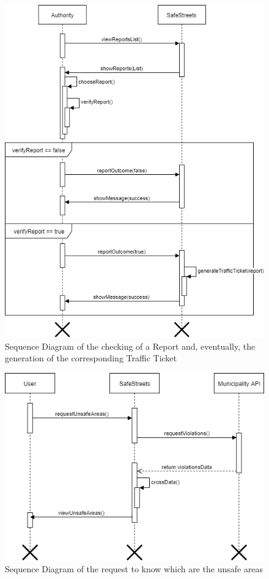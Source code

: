     \begin{figure}[h]
        \centering
        \includegraphics[scale=0.5]{Images/SeqDiag_generateTrafficTicket.png}
        \caption{Sequence Diagram of the checking of a Report and, eventually, the generation of the corresponding Traffic Ticket}
    \end{figure}
    
    \begin{figure}[h]
        \centering
        \includegraphics[scale=0.5]{Images/SeqDiag_unsafeAreas.png}
        \caption{Sequence Diagram of the request to know which are the unsafe areas}
   \end{figure}

